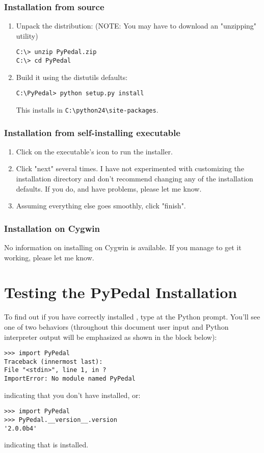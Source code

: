 \subsubsection{Installation from source}
\label{sec:installation-from-source}
\begin{enumerate}
\item Unpack the distribution: (NOTE: You may have to download an "unzipping" utility)
\begin{verbatim}
C:\> unzip PyPedal.zip
C:\> cd PyPedal
\end{verbatim}
\item Build it using the distutils defaults:
\begin{verbatim}
C:\PyPedal> python setup.py install
\end{verbatim}
This installs \PyPedal{} in \texttt{C:\textbackslash{}python24\textbackslash{}site-packages}.
\end{enumerate}
\subsubsection{Installation from self-installing executable}
\label{sec:installation-self-installing}
\begin{enumerate}
\item Click on the executable's icon to run the installer.
\item Click "next" several times.  I have not experimented with customizing the installation directory and don't recommend changing any of the installation defaults.  If you do, and have problems, please let me know.
\item Assuming everything else goes smoothly, click "finish".
\end{enumerate}
\subsubsection{Installation on Cygwin}
\label{sec:installation-cygwin}
No information on installing \PyPedal{} on Cygwin is available.  If you manage to get it working, please let me know.
\section{Testing the PyPedal Installation}
\label{sec:installation-testing}
To find out if you have correctly installed \PyPedal{}, type  at the Python prompt. You'll see one of two
behaviors (throughout this document user input and Python interpreter output will be emphasized
as shown in the block below):
\begin{verbatim}
>>> import PyPedal
Traceback (innermost last):
File "<stdin>", line 1, in ?
ImportError: No module named PyPedal
\end{verbatim}
indicating that you don't have \PyPedal{} installed, or:
\begin{verbatim}
>>> import PyPedal
>>> PyPedal.__version__.version
'2.0.0b4'
\end{verbatim}
indicating that \PyPedal{} is installed.